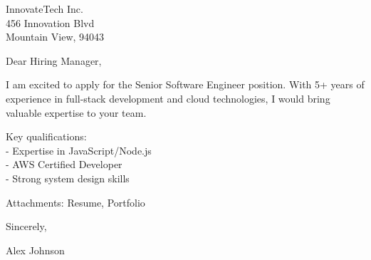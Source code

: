 \documentclass[11pt,a4paper]{letter}
\begin{document}
\begin{letter}{InnovateTech Inc.\\
456 Innovation Blvd\\
Mountain View, 94043}

\address{Alex Johnson\\
123 Tech Street\\
San Francisco, 94105\\
+1 (555) 123-4567\\
\href{mailto:alex.johnson@example.com}{alex.johnson@example.com}}

\date{June 15, 2023}

\opening{Dear Hiring Manager,}

I am excited to apply for the Senior Software Engineer position. With 5+ years of experience in full-stack development and cloud technologies, I would bring valuable expertise to your team.

Key qualifications: \\ - Expertise in JavaScript/Node.js \\ - AWS Certified Developer \\ - Strong system design skills

\vspace{\baselineskip}\noindent Attachments: Resume, Portfolio

\closing{Sincerely,}

\vspace{0.5in}
Alex Johnson

\end{letter}
\end{document}
